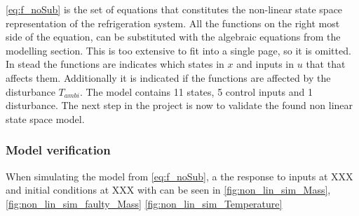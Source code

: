 \cref{eq:f_noSub} is the set of equations that constitutes the non-linear state space representation of the refrigeration system. All the functions on the right most side of the equation, can be substituted with the algebraic equations from the modelling section. This is too extensive to fit into a single page, so it is omitted. In stead the functions are indicates which states in $ x $ and inputs in $ u $ that that affects them. Additionally it is indicated if the functions are affected by the disturbance $ T_{ambi} $. The model contains 11 states, 5 control inputs and 1 disturbance. The next step in the project is now to validate the found non linear state space model.


\subsubsection{Model verification}
When simulating the model from \cref{eq:f_noSub}, a the response to inputs at XXX and initial conditions at XXX with can be seen in \cref{fig:non_lin_sim_Mass}, \cref{fig:non_lin_sim_faulty_Mass} \cref{fig:non_lin_sim_Temperature}

